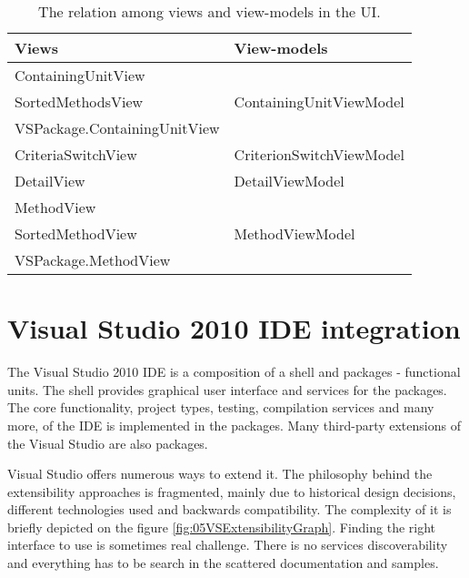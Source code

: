 \begin{table}
\centering
    \begin{tabular}{|l|l|}
        \hline
        \textbf{Views}                                                      & \textbf{View-models }    \\ \hline
        ContainingUnitView 													&       				   \\ 
        SortedMethodsView 													& ContainingUnitViewModel  \\ 
        VSPackage.ContainingUnitView 										&   					   \\ \hline
        CriteriaSwitchView                                                  & CriterionSwitchViewModel \\ \hline
        DetailView                                                          & DetailViewModel          \\ \hline
        MethodView										                    &                          \\
        SortedMethodView								                    & MethodViewModel          \\
        VSPackage.MethodView                                                &                          \\ \hline
    \end{tabular}
    \caption{The relation among views and view-models in the UI.}
   	\label{tab:05viewviewmodels}
    	
\end{table}


\section{Visual Studio 2010 IDE integration}
The Visual Studio 2010 IDE is a composition of a shell and packages - functional units. The shell provides graphical user interface and services for the packages. The core functionality, project types, testing, compilation services and many more, of the IDE is implemented in the packages. Many third-party extensions of the Visual Studio are also packages.

Visual Studio offers numerous ways to extend it. The philosophy behind the extensibility approaches is fragmented, mainly due to historical design decisions, different technologies used and backwards compatibility. The complexity of it is briefly depicted on the figure \ref{fig:05VSExtensibilityGraph}. Finding the right interface to use is sometimes real challenge. There is no services discoverability and everything has to be search in the scattered documentation and samples.


